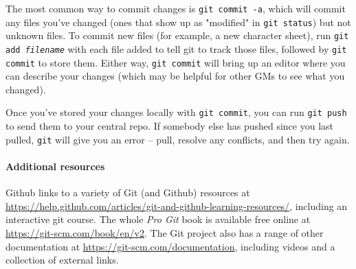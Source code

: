 \documentclass[green]{testgame}
\begin{document}
The most common way to commit changes is \texttt{git commit -a}, which will commit any files you've changed (ones that show up as "modified" in \texttt{git status}) but not unknown files. To commit new files (for example, a new character sheet), run \texttt{git add \emph{filename}} with each file added to tell git to track those files, followed by \texttt{git commit} to store them. Either way, \texttt{git commit} will bring up an editor where you can describe your changes (which may be helpful for other GMs to see what you changed).

Once you've stored your changes locally with \texttt{git commit}, you can run \texttt{git push} to send them to your central repo. If somebody else has pushed since you last pulled, \texttt{git} will give you an error -- pull, resolve any conflicts, and then try again.

\paragraph*{Additional resources}

Github links to a variety of Git (and Github) resources at \url{https://help.github.com/articles/git-and-github-learning-resources/}, including an interactive git course. The whole \emph{Pro Git} book is available free online at \url{https://git-scm.com/book/en/v2}. The Git project also has a range of other documentation at \url{https://git-scm.com/documentation}, including videos and a collection of external links.
\end{document}

